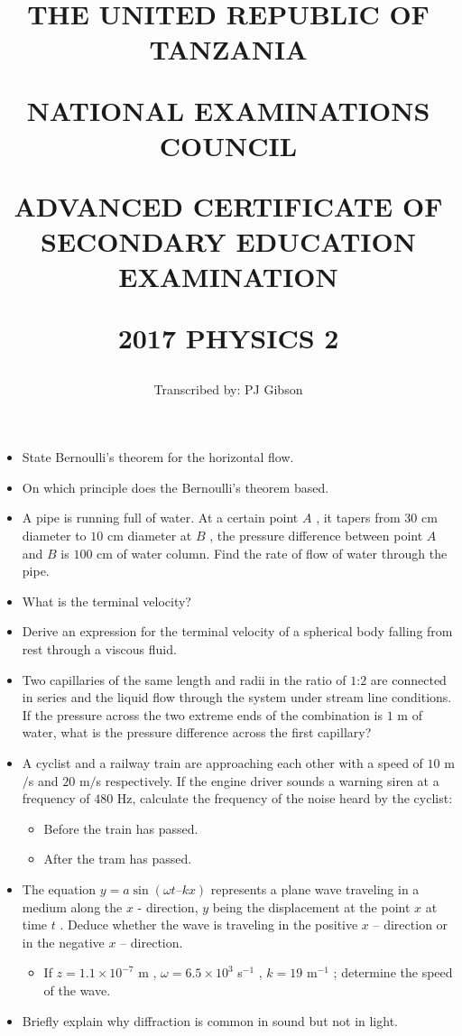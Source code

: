 \documentclass{article}
\title{THE UNITED REPUBLIC OF TANZANIA

NATIONAL EXAMINATIONS COUNCIL

ADVANCED CERTIFICATE OF SECONDARY EDUCATION EXAMINATION

\textbf{2017 PHYSICS 2}}
\author{Transcribed by:  PJ Gibson}
\begin{document}
\maketitle

\begin{itemize}
\item State Bernoulli's theorem for the horizontal flow. 
\item On which principle does the Bernoulli's theorem based. 
\item A pipe is running full of water. At a certain point $ A$ , it tapers from $ 30$ cm diameter to $ 10$ cm diameter at $ B$ , the pressure difference between point $ A$ and $ B$ is $ 100$ cm of water column. Find the rate of flow of water through the pipe. 
\item What is the terminal velocity?
\item Derive an expression for the terminal velocity of a spherical body falling  from rest through a viscous fluid. 
\item Two capillaries of the same length and radii in the ratio of $ 1$:$ 2$ are connected in series and the liquid flow through the system under stream line conditions. If the pressure across the two extreme ends of the combination is  $ 1$ m of water, what is the pressure difference across the first capillary?
\item A cyclist and a railway train are approaching each other with a speed of $ 10$ m$/$s and $ 20$ m$/$s respectively. If the engine driver sounds a warning siren at a frequency of  $ 480$ Hz, calculate the frequency of the noise heard by the cyclist:
 \begin{itemize}
\item Before the train has passed.
\item After the tram has passed. 
\end{itemize}
\item The equation $ y= a  \sin(\omega t – kx)$ represents a plane wave traveling in a medium along the $ x$ - direction, $ y$ being the displacement at the point $ x$ at time $ t$ . Deduce whether the wave is traveling in the positive $ x$ – direction or in the negative $ x$ – direction.
 \begin{itemize}
\item If $ z=1.1 \times 10^{-7}$ m , $ \omega = 6.5 \times 10^{3}$ s$ ^{-1}$ , $ k=19$ m$ ^{-1}$ ; determine the speed of the wave.
\end{itemize}
\item Briefly explain why diffraction is common in sound but not in light.

\end{itemize}
\end{document}
